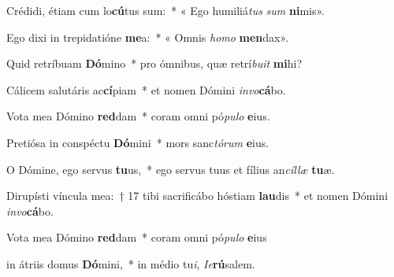 \item Crédidi, étiam cum lo\textbf{cú}tus sum:~* « Ego humiliá\textit{tus} \textit{sum} \textbf{ni}mis».

\item Ego dixi in trepidatióne \textbf{me}a:~* « Omnis \textit{homo} \textbf{men}dax».

\item Quid retríbuam \textbf{Dó}mino~* pro ómnibus, quæ retrí\textit{buit} \textbf{mi}hi?

\item Cálicem salutáris ac\textbf{cí}piam~* et nomen Dómini \textit{invo}\textbf{cá}bo.

\item Vota mea Dómino \textbf{red}dam~* coram omni pó\textit{pulo} \textbf{e}ius.

\item Pretiósa in conspéctu \textbf{Dó}mini~* mors sanc\textit{tórum} \textbf{e}ius.

\item O Dómine, ego servus \textbf{tu}us,~* ego servus tuus et fílius an\textit{cíllæ} \textbf{tu}æ.

\item Dirupísti víncula mea:~† 17 tibi sacrificábo hóstiam \textbf{lau}dis~* et nomen Dómini \textit{invo}\textbf{cá}bo.

\item Vota mea Dómino \textbf{red}dam~* coram omni pó\textit{pulo} \textbf{e}ius

\item in átriis domus \textbf{Dó}mini,~* in médio tu\textit{i}, \textit{Ie}\textbf{rú}salem.
